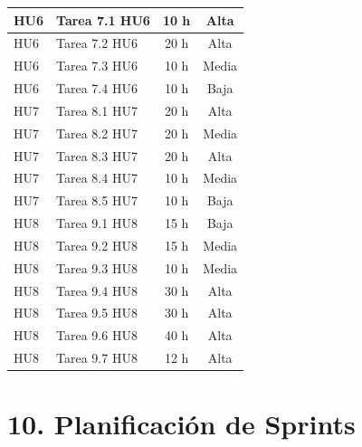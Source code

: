 \documentclass[
11pt, %
]{charter}
\begin{document}
\begin{table}[htpb]
\begin{tabularx}{\linewidth}{@{}|X|X|c|c|@{}}
HU6 & Tarea 7.1 HU6 & 10 h & Alta \\ \hline
HU6 & Tarea 7.2 HU6 & 20 h & Alta \\ \hline
HU6 & Tarea 7.3 HU6 & 10 h & Media \\ \hline
HU6 & Tarea 7.4 HU6 & 10 h & Baja \\ \hline

HU7 & Tarea 8.1 HU7 & 20 h & Alta \\ \hline
HU7 & Tarea 8.2 HU7 & 20 h & Media \\ \hline
HU7 & Tarea 8.3 HU7 & 20 h & Alta \\ \hline
HU7 & Tarea 8.4 HU7 & 10 h & Media \\ \hline
HU7 & Tarea 8.5 HU7 & 10 h & Baja \\ \hline

HU8 & Tarea 9.1 HU8 & 15 h & Baja \\ \hline
HU8 & Tarea 9.2 HU8 & 15 h & Media \\ \hline
HU8 & Tarea 9.3 HU8 & 10 h & Media \\ \hline
HU8 & Tarea 9.4 HU8 & 30 h & Alta \\ \hline
HU8 & Tarea 9.5 HU8 & 30 h & Alta \\ \hline
HU8 & Tarea 9.6 HU8 & 40 h & Alta \\ \hline
HU8 & Tarea 9.7 HU8 & 12 h & Alta \\ \hline

\end{tabularx}
\end{table}

\section{10. Planificación de Sprints}
\end{document}
